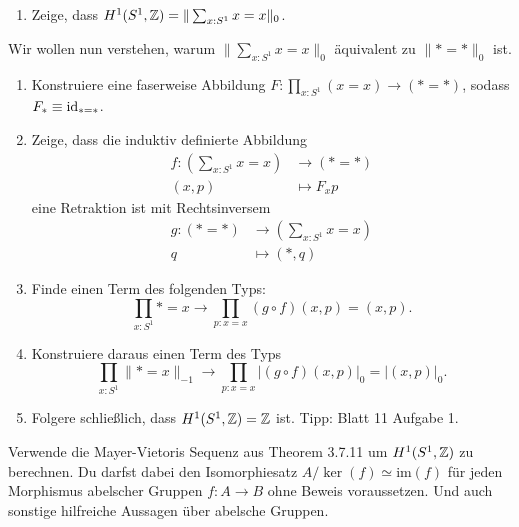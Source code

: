 \documentclass{uebung}
\begin{document}

\begin{exercise}
\end{exercise}

\begin{exercise}
  \begin{enumerate}
    \item Zeige, dass $H^1(S^1,\mathbb{Z}) = \|\sum_{x:S^1} x=x\|_0$.
  \end{enumerate}
  Wir wollen nun verstehen, warum $\|\sum_{x:S^1} x=x\|_0$ äquivalent zu $\|\ast = \ast\|_0$ ist.
  \begin{enumerate}[start=2]
    \item Konstruiere eine faserweise Abbildung $F:\prod_{x:S^1} (x = x) \to (\ast = \ast)$, sodass $F_\ast\equiv\mathrm{id}_{\ast = \ast}$.
    \item Zeige, dass die induktiv definierte Abbildung
      \begin{align*}
        f:\left(\sum_{x:S^1} x=x\right) &\to (\ast=\ast)\\
        (x,p)&\mapsto F_xp
      \end{align*}
      eine Retraktion ist mit Rechtsinversem
      \begin{align*}
        g:(\ast=\ast) &\to \left(\sum_{x:S^1} x=x\right)\\
        q &\mapsto (\ast,q)
      \end{align*}
    \item Finde einen Term des folgenden Typs:
      $$
      \prod_{x:S^1} \ast=x \to \prod_{p:x=x} (g\circ f)(x,p) = (x,p).
      $$
    \item Konstruiere daraus einen Term des Typs
      $$
      \prod_{x:S^1} \|\ast=x\|_{-1} \to \prod_{p:x=x} |(g\circ f)(x,p)|_0 = |(x,p)|_0.
      $$
    \item Folgere schließlich, dass $H^1(S^1,\mathbb{Z}) = \mathbb{Z}$ ist.
      {\tiny Tipp: Blatt 11 Aufgabe 1.}
  \end{enumerate}
\end{exercise}

\begin{exercise}
  Verwende die Mayer-Vietoris Sequenz aus Theorem 3.7.11 um $H^1(S^1,\mathbb{Z})$ zu berechnen.
  Du darfst dabei den Isomorphiesatz $A/\ker(f)\simeq \mathrm{im}(f)$ für jeden Morphismus abelscher Gruppen $f:A\to B$ ohne Beweis voraussetzen.
  {\tiny Und auch sonstige hilfreiche Aussagen über abelsche Gruppen.}
\end{exercise}
\end{document}
